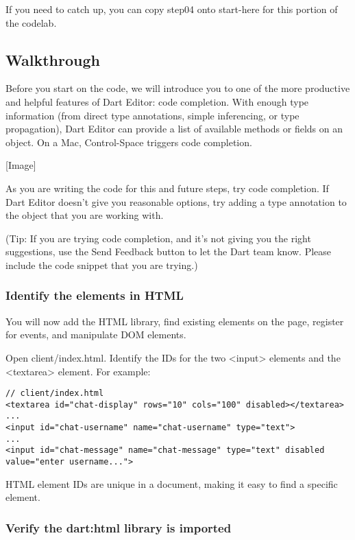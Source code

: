 If you need to catch up, you can copy step04 onto start-here for this portion of the codelab.

\subsection{Walkthrough}

Before you start on the code, we will introduce you to one of the more productive and helpful features of Dart Editor: code completion.
With enough type information (from direct type annotations, simple inferencing, or type propagation), Dart Editor can provide a list of available methods or fields on an object. On a Mac, Control-Space triggers code completion.

[Image]

As you are writing the code for this and future steps, try code completion. If Dart Editor doesn’t give you reasonable options, try adding a type annotation to the object that you are working with.

(Tip: If you are trying code completion, and it's not giving you the right suggestions, use the Send Feedback button to let the Dart team know. Please include the code snippet that you are trying.)

\subsubsection{Identify the elements in HTML}

You will now add the HTML library, find existing elements on the page, register for events, and manipulate DOM elements.

Open client/index.html. Identify the IDs for the two <input> elements and the <textarea> element. For example:

\begin{verbatim}
// client/index.html
<textarea id="chat-display" rows="10" cols="100" disabled></textarea>
...
<input id="chat-username" name="chat-username" type="text">
...
<input id="chat-message" name="chat-message" type="text" disabled
value="enter username...">
\end{verbatim}

HTML element IDs are unique in a document, making it easy to find a specific element.

\subsubsection{Verify the dart:html library is imported}

